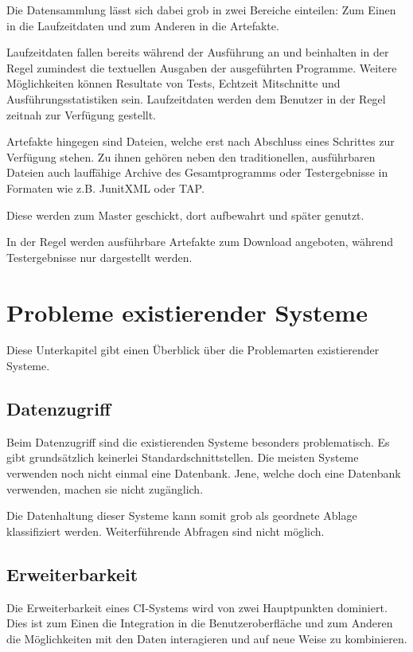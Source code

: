 Die Datensammlung lässt sich dabei grob in zwei Bereiche einteilen:
Zum Einen in die Laufzeitdaten und zum Anderen in die Artefakte.

Laufzeitdaten fallen bereits w\"ahrend der Ausf\"uhrung an
und beinhalten in der Regel zumindest die textuellen Ausgaben
der ausgef\"uhrten Programme.
Weitere M\"oglichkeiten k\"onnen Resultate von Tests, Echtzeit Mitschnitte und Ausführungsstatistiken sein.
Laufzeitdaten werden dem Benutzer in der Regel zeitnah zur Verfügung gestellt.

Artefakte hingegen sind Dateien,
welche erst nach Abschluss eines Schrittes zur Verfügung stehen.
Zu ihnen geh\"oren neben den traditionellen, ausf\"uhrbaren Dateien
auch lauff\"ahige Archive des Gesamtprogramms oder Testergebnisse in Formaten wie z.B. JunitXML \cite{jenkins:junitxml} oder \ac{TAP}.


Diese werden zum Master geschickt, dort aufbewahrt und sp\"ater genutzt.

In der Regel werden ausf\"uhrbare Artefakte zum Download angeboten,
w\"ahrend Testergebnisse nur dargestellt werden.


\section{Probleme existierender Systeme}

Diese Unterkapitel gibt einen \"Uberblick \"uber die Problemarten existierender Systeme.

\subsection{Datenzugriff}

Beim Datenzugriff sind die existierenden Systeme besonders problematisch.
Es gibt grundsätzlich keinerlei Standardschnittstellen.
Die meisten Systeme verwenden noch nicht einmal eine Datenbank.
Jene, welche doch eine Datenbank verwenden, machen sie nicht zugänglich.

Die Datenhaltung dieser Systeme kann somit grob als geordnete Ablage klassifiziert werden.
Weiterführende Abfragen sind nicht möglich.

\subsection{Erweiterbarkeit}

Die Erweiterbarkeit eines \ac{CI}-Systems wird von zwei Hauptpunkten dominiert.
Dies ist zum Einen die Integration in die Benutzeroberfl\"ache
und zum Anderen die Möglichkeiten mit den Daten interagieren
und auf neue Weise zu kombinieren.

